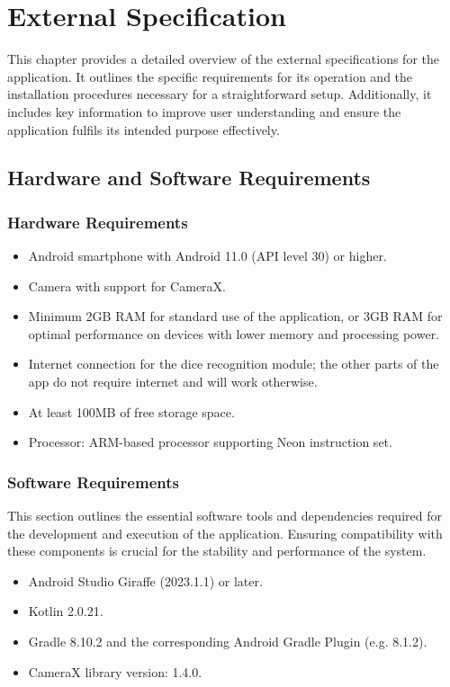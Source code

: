 \chapter{External Specification}
\label{chap:external-specifications}

This chapter provides a detailed overview of the external specifications for the application. It outlines the specific requirements for its operation and the installation procedures necessary for a straightforward setup. Additionally, it includes key information to improve user understanding and ensure the application fulfils its intended purpose effectively.

\section{Hardware and Software Requirements}
\subsection{Hardware Requirements}
\begin{itemize}
    \item Android smartphone with Android 11.0 (API level 30) or higher.
    \item Camera with support for CameraX.
     \item Minimum 2GB RAM for standard use of the application, or 3GB RAM for optimal performance on devices with lower memory and processing power.
    \item Internet connection for the dice recognition module; the other parts of the app do not require internet and will work otherwise.
    \item At least 100MB of free storage space.
    \item Processor: ARM-based processor supporting Neon instruction set.
\end{itemize}

\subsection{Software Requirements}
This section outlines the essential software tools and dependencies required for the development and execution of the application. Ensuring compatibility with these components is crucial for the stability and performance of the system.
\begin{itemize}
    \item Android Studio Giraffe (2023.1.1) or later.
    \item Kotlin 2.0.21.
    \item Gradle 8.10.2 and the corresponding Android Gradle Plugin (e.g. 8.1.2).
    \item CameraX library version: 1.4.0.
\end{itemize}



